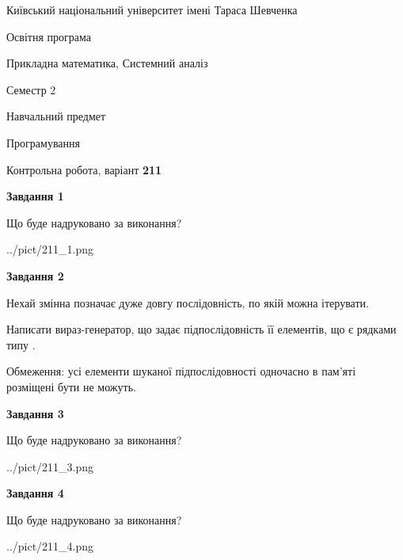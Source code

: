 \documentclass[12pt, ukrainian]{article}
\begin{document}
{{\begin {small}\par
{ \center  Київський національний університет імені Тараса Шевченка \par}
{\parbox {5 cm}{Освітня програма \hfill}{\parbox {8 cm}{Прикладна математика, Системний аналіз \hfill}}\parbox {5 cm}{\hfill Семестр 2}}\par
{\parbox {5 cm} {Навчальний предмет \hfill}\parbox {7 cm}{Програмування \hfill}\parbox {6cm}{\hfill}\par}\vspace{-7pt} \end{small}}{\center Контрольна робота, варіант  \No \textbf
{ 211 }\par}}
{
\begin {large}
{\begin {center}\textbf{Завдання 1}\end {center}}\par
Що буде надруковано за виконання?\par\par
\begin{center}
	{../pict/211_1.png}
\end{center}
\newpage

{\begin {center}\textbf{Завдання 2}\end {center}}\par
Нехай змінна  позначає дуже довгу послідовність, по якій можна ітерувати.

Написати вираз-генератор, що задає підпослідовність її елементів, що є рядками типу .

Обмеження: усі елементи шуканої підпослідовності одночасно в пам'яті розміщені бути не можуть.\par
\newpage

{\begin {center}\textbf{Завдання 3}\end {center}}\par
Що буде надруковано за виконання?
\begin{center}
	{../pict/211_3.png}
\end{center}
\newpage

{\begin {center}\textbf{Завдання 4}\end {center}}\par
Що буде надруковано за виконання?\par
\begin{center}
	{../pict/211_4.png}
\end{center}
\newpage


\end{large}}
\end{document}
